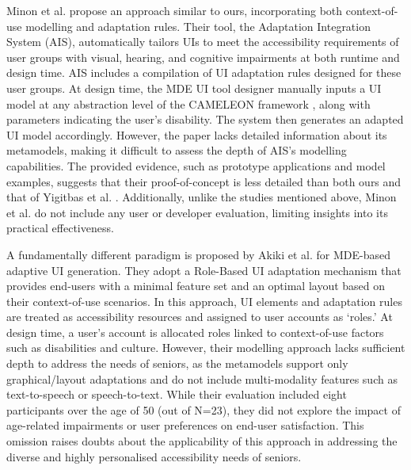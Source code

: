 Minon et al. \cite{minon2015} propose an approach similar to ours, incorporating both context-of-use modelling and adaptation rules. Their tool, the Adaptation Integration System (AIS), automatically tailors UIs to meet the accessibility requirements of user groups with visual, hearing, and cognitive impairments at both runtime and design time. AIS includes a compilation of UI adaptation rules designed for these user groups. At design time, the MDE UI tool designer manually inputs a UI model at any abstraction level of the CAMELEON framework \cite{calvary2002}, along with parameters indicating the user’s disability. The system then generates an adapted UI model accordingly. However, the paper lacks detailed information about its metamodels, making it difficult to assess the depth of AIS’s modelling capabilities. The provided evidence, such as prototype applications and model examples, suggests that their proof-of-concept is less detailed than both ours and that of Yigitbas et al. \cite{yigitbas2020}. Additionally, unlike the studies mentioned above, Minon et al. \cite{minon2015} do not include any user or developer evaluation, limiting insights into its practical effectiveness.

A fundamentally different paradigm is proposed by Akiki et al. \cite{akiki2016} for MDE-based adaptive UI generation. They adopt a Role-Based UI adaptation mechanism that provides end-users with a minimal feature set and an optimal layout based on their context-of-use scenarios. In this approach, UI elements and adaptation rules are treated as accessibility resources and assigned to user accounts as ‘roles.’ At design time, a user’s account is allocated roles linked to context-of-use factors such as disabilities and culture. However, their modelling approach lacks sufficient depth to address the needs of seniors, as the metamodels support only graphical/layout adaptations and do not include multi-modality features such as text-to-speech or speech-to-text. While their evaluation included eight participants over the age of 50 (out of N=23), they did not explore the impact of age-related impairments or user preferences on end-user satisfaction. This omission raises doubts about the applicability of this approach in addressing the diverse and highly personalised accessibility needs of seniors.

